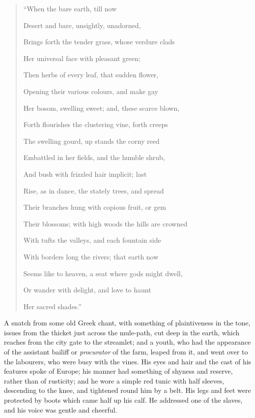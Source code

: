 \begin{quote}

``When the bare earth, till now

Desert and bare, unsightly, unadorned,

Brings forth the tender grass, whose verdure clads

Her universal face with pleasant green;

Then herbs of every leaf, that sudden flower,

Opening their various colours, and make gay

Her bosom, swelling sweet; and, these scarce blown, 

Forth flourishes the clustering vine, forth creeps

The swelling gourd, up stands the corny reed

Embattled in her fields, and the humble shrub,

And bush with frizzled hair implicit; last

Rise, as in dance, the stately trees, and spread

Their branches hung with copious fruit, or gem

Their blossoms; with high woods the hills are crowned

With tufts the valleys, and each fountain side

With borders long the rivers; that earth now

Seems like to heaven, a seat where gods might dwell,

Or wander with delight, and love to haunt

Her sacred shades.''

\end{quote}

A snatch from some old Greek chant, with something of plaintiveness
in the tone, issues from the thicket just across the mule-path, cut
deep in the earth, which reaches from the city gate to the streamlet;
and a youth, who had the appearance of the assistant bailiff or \emph{procurator}
of the farm, leaped from it, and went over to the labourers, who were
busy with the vines. His eyes and hair and the cast of his features
spoke of Europe; his manner had something of shyness and reserve,
rather than of rusticity; and he wore a simple red tunic with half
sleeves, descending to the knee, and tightened round him by a belt.
His legs and feet were protected by boots which came half up his calf.
He addressed one of the slaves, and his voice was gentle and cheerful.

